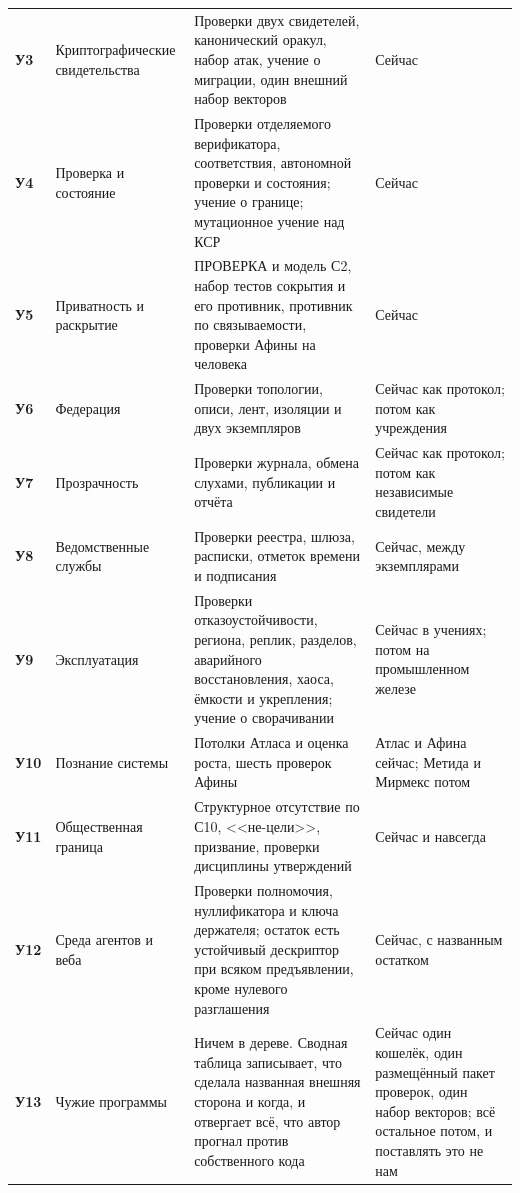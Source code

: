 {\begin{xltabular}{\textwidth}{>{\bfseries\hspace{0pt}}p{0.68in} >{\RaggedRight\arraybackslash\hspace{0pt}}p{1.55in} >{\RaggedRight\arraybackslash\hspace{0pt}}X >{\RaggedRight\arraybackslash\hspace{0pt}}p{1.15in}}
У3 & Криптографические свидетельства & Проверки двух свидетелей, канонический оракул, набор атак, учение о миграции, один внешний набор векторов & Сейчас \\
У4 & Проверка и состояние & Проверки отделяемого верификатора, соответствия, автономной проверки и состояния; учение о границе; мутационное учение над КСР & Сейчас \\
У5 & Приватность и раскрытие & ПРОВЕРКА и модель С2, набор тестов сокрытия и его противник, противник по связываемости, проверки Афины на человека & Сейчас \\
У6 & Федерация & Проверки топологии, описи, лент, изоляции и двух экземпляров & Сейчас как протокол; потом как учреждения \\
У7 & Прозрачность & Проверки журнала, обмена слухами, публикации и отчёта & Сейчас как протокол; потом как независимые свидетели \\
У8 & Ведомственные службы & Проверки реестра, шлюза, расписки, отметок времени и подписания & Сейчас, между экземплярами \\
У9 & Эксплуатация & Проверки отказоустойчивости, региона, реплик, разделов, аварийного восстановления, хаоса, ёмкости и укрепления; учение о сворачивании & Сейчас в учениях; потом на промышленном железе \\
У10 & Познание системы & Потолки Атласа и оценка роста, шесть проверок Афины & Атлас и Афина сейчас; Метида и Мирмекс потом \\
У11 & Общественная граница & Структурное отсутствие по С10, <<не-цели>>, призвание, проверки дисциплины утверждений & Сейчас и навсегда \\
У12 & Среда агентов и веба & Проверки полномочия, нуллификатора и ключа держателя; остаток есть устойчивый дескриптор при всяком предъявлении, кроме нулевого разглашения & Сейчас, с названным остатком \\
У13 & Чужие программы & Ничем в дереве. Сводная таблица записывает, что сделала названная внешняя сторона и когда, и отвергает всё, что автор прогнал против собственного кода & Сейчас один кошелёк, один размещённый пакет проверок, один набор векторов; всё остальное потом, и поставлять это не нам \\
\end{xltabular}
}


